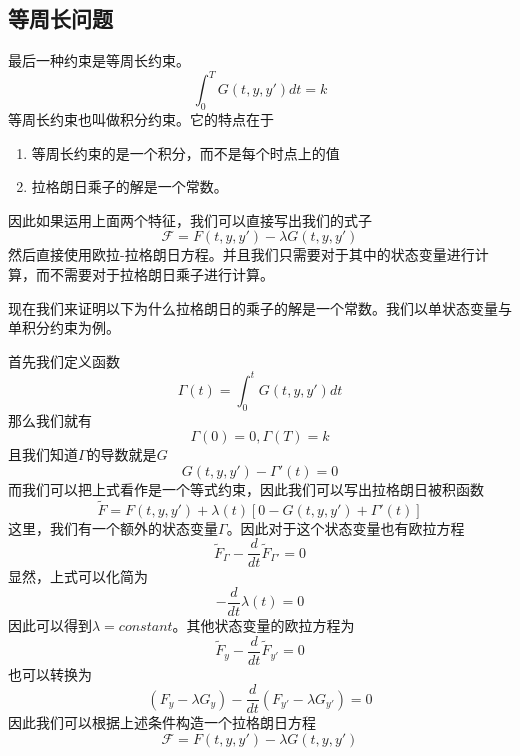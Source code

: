 \documentclass[UTF8,12pt]{ctexart}
\numberwithin{equation}{section} %
\numberwithin{figure}{section}
\numberwithin{table}{section}
\begin{document}
	\subsection{等周长问题}
	最后一种约束是等周长约束。
	\begin{equation}
		\int_{0}^{T}G(t,y,y')dt = k
	\end{equation}
	等周长约束也叫做积分约束。它的特点在于
	\begin{enumerate}
		\item 等周长约束的是一个积分，而不是每个时点上的值
		
		\item 拉格朗日乘子的解是一个常数。
	\end{enumerate}
	因此如果运用上面两个特征，我们可以直接写出我们的式子
	\begin{equation}
		\mathscr{F} = F(t,y,y') - \lambda G(t,y,y')
	\end{equation}
	然后直接使用欧拉-拉格朗日方程。并且我们只需要对于其中的状态变量进行计算，而不需要对于拉格朗日乘子进行计算。
	
	现在我们来证明以下为什么拉格朗日的乘子的解是一个常数。我们以单状态变量与单积分约束为例。
	
	首先我们定义函数
	\begin{equation}
		\Gamma(t) = \int_{0}^{t}G(t,y,y')dt
	\end{equation}
	那么我们就有
	\begin{equation}
		\Gamma(0) = 0,\Gamma(T) = k
	\end{equation}
	且我们知道$\Gamma$的导数就是$G$
	\begin{equation}
		G(t,y,y') - \Gamma'(t) = 0
	\end{equation}
	而我们可以把上式看作是一个等式约束，因此我们可以写出拉格朗日被积函数
	\begin{equation}
		\tilde{F} = F(t,y,y') + \lambda(t)[0 - G(t,y,y') + \Gamma'(t)]
	\end{equation}
	这里，我们有一个额外的状态变量$\Gamma$。因此对于这个状态变量也有欧拉方程
	\begin{equation}
		\tilde{F}_{\Gamma} - \frac{d}{dt}\tilde{F}_{\Gamma'} = 0
	\end{equation}
	显然，上式可以化简为
	\begin{equation}
		- \frac{d}{dt} \lambda(t) = 0
	\end{equation}
	因此可以得到$\lambda = constant$。其他状态变量的欧拉方程为
	\begin{equation}
		\tilde{F}_{y} - \frac{d}{dt}\tilde{F}_{y'} = 0
	\end{equation}
	也可以转换为
	\begin{equation}
		(F_y - \lambda G_y) - \frac{d}{dt}(F_{y'} - \lambda G_{y'}) = 0
	\end{equation}
	因此我们可以根据上述条件构造一个拉格朗日方程
	\begin{equation}
		\mathscr{F} = F(t,y,y') - \lambda G(t,y,y')
	\end{equation}
\end{document}
